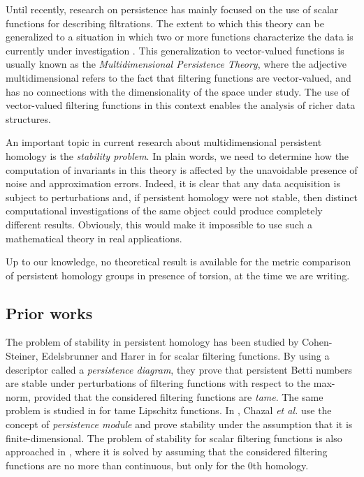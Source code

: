 \documentclass{amsart}
\theoremstyle{definition}
\theoremstyle{remark}
\numberwithin{equation}{section}
\begin{document}
Until recently, research on persistence has mainly focused on the use of scalar functions for describing filtrations.
The extent to which this theory can be generalized to a situation
in which two or more functions characterize the data is currently
under investigation \cite{BiCeFrGiLa08,CaDiFe10,CaLa11,CaSiZo09,CaZo09}. This
generalization to vector-valued functions is usually known as the
\emph{Multidimensional Persistence Theory}, where the adjective
multidimensional refers to the fact that filtering functions are
vector-valued, and has no connections with the dimensionality of
the space under study. The use of vector-valued filtering
functions in this context
enables the analysis of richer
data structures.

An important topic in current research about
multidimensional persistent homology is the \emph{stability
problem}. In plain words, we need to determine how the computation
of invariants in this theory is affected by the unavoidable
presence of noise and approximation errors. Indeed, it is clear
that any data acquisition is subject to perturbations and, if
persistent homology were not stable, then distinct computational
investigations of the same object could produce completely
different results. Obviously, this would make it impossible to use
such a mathematical theory in real applications.

Up to our knowledge, no theoretical result is available for the metric comparison of persistent homology groups in presence of torsion, at the time we are writing.

\subsection*{Prior works}
The problem of stability in persistent homology has been studied
by Cohen-Steiner, Edelsbrunner and Harer in \cite{CoEdHa07} for
scalar filtering functions. By using a descriptor called a
\emph{persistence diagram}, they prove that persistent Betti
numbers are stable under perturbations of filtering functions with
respect to the max-norm, provided that the considered filtering
functions are \emph{tame}. The same problem is studied in
\cite{CoEdHaMi10} for tame Lipschitz functions. In \cite{ChCo*09},
Chazal {\em et al.} use the concept of \emph{persistence
module} and prove stability under the assumption that it is
finite-dimensional. The problem of stability for scalar filtering
functions is also approached in \cite{dAFrLa10}, where it is solved
by assuming that the considered filtering functions are no more
than continuous, but only for the 0th homology.
\end{document}
